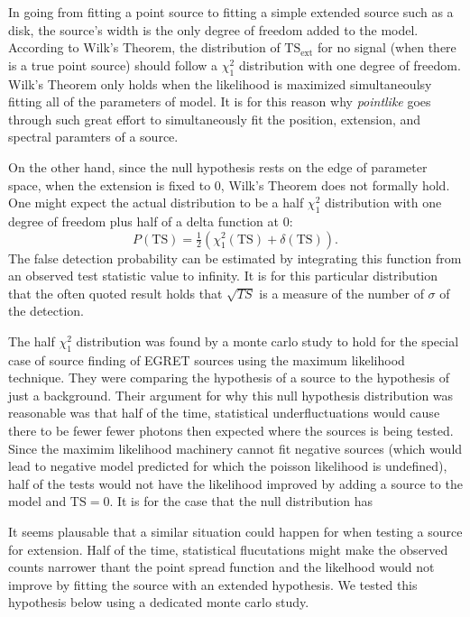 \documentclass{emulateapj}
\begin{document}
In going from fitting a point source to fitting a simple extended source such as
a disk, the source's width is the only degree of freedom added to the model. According to
Wilk's Theorem, the distribution of $\text{TS}_\text{ext}$ for no signal (when there is a true
point source) should follow a $\chi^2_1$ distribution with one degree of freedom\cite{Wilks_Theorem}.
Wilk's Theorem only holds when the likelihood is maximized simultaneoulsy
fitting all of the parameters of model. It is for this reason why {\em pointlike}
goes through such great effort to simultaneously fit the position, extension,
and spectral paramters of a source.

On the other hand, since the null hypothesis rests on the edge of
parameter space, when the extension is fixed to 0, Wilk's Theorem does
not formally hold\cite{Warnings about Wilk's Theorem Paper}.  One might
expect the actual distribution to be a half $\chi^2_1$ distribution with
one degree of freedom plus half of a delta function at 0:
\begin{equation}
  P(\text{TS})=\tfrac{1}{2}(\chi^2_1(\text{TS})+\delta(\text{TS})).
\end{equation}
The false detection probability can be estimated by integrating this function 
from an observed test statistic value to infinity. It is for this
particular distribution that the often quoted result holds that
$\sqrt{TS}$ is a measure of the number of $\sigma$ of the detection.

The half $\chi^2_1$ distribution was found by a monte carlo study
to hold for the special case of source finding of EGRET sources using the
maximum likelihood technique.  They were comparing the hypothesis of a
source to the hypothesis of just a background\cite{Mattox_et_All_Paper}.
Their argument for why this null hypothesis distribution was reasonable
was that half of the time, statistical underfluctuations would cause
there to be fewer fewer photons then expected where the sources is being
tested. Since the maximim likelihood machinery cannot fit negative
sources (which would lead to negative model predicted for which the
poisson likelihood is undefined), half of the tests would not have the
likelihood improved by adding a source to the model and $\text{TS}=0$.
It is for the case that the null distribution has 

It seems plausable that a similar situation could happen for when testing
a source for extension. Half of the time, statistical flucutations might
make the observed counts narrower thant the point spread function and
the likelhood would not improve by fitting the source with an extended
hypothesis. We tested this hypothesis below using a dedicated monte
carlo study.
\end{document}
